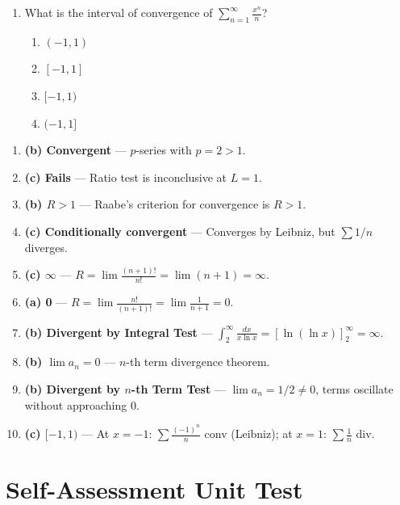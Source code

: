 \begin{enumerate}[leftmargin=1.5em]
    \item What is the interval of convergence of $\sum_{n=1}^\infty \frac{x^n}{n}$?
    \begin{enumerate}[label=(\alph*)]
        \item $(-1, 1)$
        \item $[-1, 1]$
        \item ${[-1, 1)}$
        \item $(-1, 1]$
    \end{enumerate}
\end{enumerate}

\begin{solutionbox}
\begin{enumerate}
    \item \textbf{(b) Convergent} --- $p$-series with $p=2 > 1$.
    \item \textbf{(c) Fails} --- Ratio test is inconclusive at $L=1$.
    \item \textbf{(b) $R > 1$} --- Raabe's criterion for convergence is $R > 1$.
    \item \textbf{(c) Conditionally convergent} --- Converges by Leibniz, but $\sum 1/n$ diverges.
    \item \textbf{(c) $\infty$} --- $R = \lim \frac{(n+1)!}{n!} = \lim (n+1) = \infty$.
    \item \textbf{(a) 0} --- $R = \lim \frac{n!}{(n+1)!} = \lim \frac{1}{n+1} = 0$.
    \item \textbf{(b) Divergent by Integral Test} --- $\int_2^\infty \frac{dx}{x\ln x} = [\ln(\ln x)]_2^\infty = \infty$.
    \item \textbf{(b) $\lim a_n = 0$} --- $n$-th term divergence theorem.
    \item \textbf{(b) Divergent by $n$-th Term Test} --- $\lim a_n = 1/2 \ne 0$, terms oscillate without approaching 0.
    \item \textbf{(c) ${[-1, 1)}$} --- At $x=-1$: $\sum \frac{(-1)^n}{n}$ conv (Leibniz); at $x=1$: $\sum \frac{1}{n}$ div.
\end{enumerate}
\end{solutionbox}

\section{Self-Assessment Unit Test}

